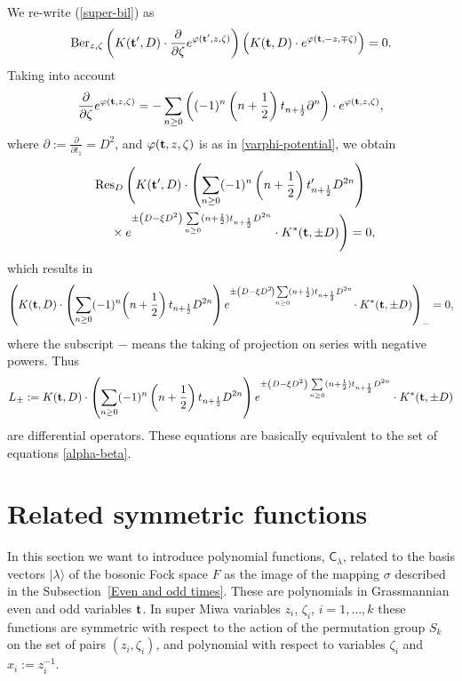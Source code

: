 \documentclass[pdftex]{sigma}
\numberwithin{equation}{section}
\newcommand{\Res}{\mathop\mathrm{Res}\nolimits}
\newcommand{\Ber}{\mathop\mathrm{Ber}\nolimits}
\newcommand{\C}{\textsf{C}_}
\newcommand{\bt}{{\bf {t}}}
\renewcommand{\r}{\rangle}
\begin{document}
 We re-write (\ref{super-bil}) as
\[
\Ber_{z,\zeta} \left(K({\bf
t'},D)\cdot\frac{\partial}{\partial \zeta} e^{\varphi({\bf
t'},z,\zeta)}\right) \left(K({\bf t},D)\cdot e^{\varphi({\bf
t},-z,\mp \zeta)}\right)  = 0.
\]
Taking into account
  \[
\frac{\partial}{\partial \zeta} e^{\varphi({\bf
t},z,\zeta)} = -  \sum_{n\ge 0} \left( (-1)^n\left(n+\frac
1{2}\right)t_{n+\frac 12}\partial^{n} \right)\cdot e^{\varphi({\bf
t},z,\zeta)},
  \]
 where $\partial:=\frac{\partial}{\partial t_1}=D^2$, and
 $\varphi({\bf t},z,\zeta)$ is as in \eqref{varphi-potential},
we obtain
\begin{gather*}
  \Res_D \Bigg( K({\bf t'},D)\cdot
\left(\sum_{n\ge 0} (-1)^n\left(  n+\frac12 \right)t_{n+\frac
12}'D^{2n} \right) \\
\qquad {}\times e^{\pm\left(D-\xi D^2\right)
\sum\limits_{n\ge 0}  (n+\frac 12)t_{n+\frac12}D^{2n} } \cdot K^*({\bf t},\pm D)
\Bigg)=0,
\end{gather*}
which results in
\begin{gather*}
   \left(K({\bf t},D)\cdot
\left(\sum_{n\ge 0} (-1)^n\!\left(n+\frac 1{2}\right)t_{n+\frac
12}D^{2n} \right)  e^{\pm\left(D-\xi D^2\!\right)
\!\sum\limits_{n\ge 0} \! (n+\frac 12)t_{n+\frac12}D^{2n} }\! \cdot K^*({\bf t},\pm D)\right)_-  = 0,
\end{gather*}
  where the subscript $-$ means the taking of projection on series
  with negative powers. Thus
\begin{gather*}
L_\pm := K({\bf t},D)\cdot \left(\sum_{n\ge
0} (-1)^n\left(n+\frac 1{2}\right)t_{n+\frac 12}D^{2n} \right)  e^{\pm\left(D-\xi D^2\right)
\sum\limits_{n\ge 0}  (n+\frac 12)t_{n+\frac12}D^{2n} }
\cdot K^*({\bf t},\pm D)
\end{gather*}
are dif\/ferential operators. These equations are basically equivalent to the set of equations \eqref{alpha-beta}.





\section{Related symmetric functions\label{Related}}

In this section we want to introduce polynomial functions, $\C\lambda$, related to the basis vectors $|\lambda \r $ of
the bosonic Fock space $F$ as the image of the mapping $\sigma$ described in the Subsection~\ref{Even and odd times}. These are
polynomials in Grassmannian even and odd variables $\bt$. In super Miwa variables $z_i$, $\zeta_i$, $i=1,\dots, k$ these
functions are symmetric with respect to the action of the permutation group $S_k$ on the set of pairs $(z_i,\zeta_i)$,
and polynomial with respect to variables $\zeta_i$ and $x_i:=z_i^{-1}$.
\end{document}
